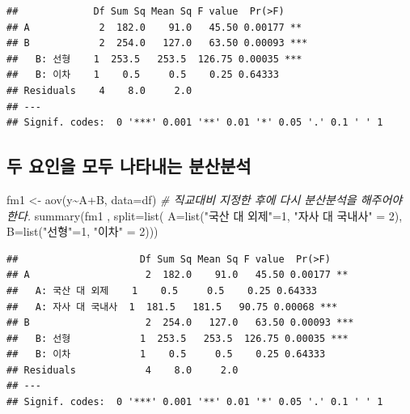 \documentclass[
]{book}
\newenvironment{Shaded}{\begin{snugshade}}{\end{snugshade}}
\newcommand{\AttributeTok}[1]{\textcolor[rgb]{0.77,0.63,0.00}{#1}}
\newcommand{\CommentTok}[1]{\textcolor[rgb]{0.56,0.35,0.01}{\textit{#1}}}
\newcommand{\DecValTok}[1]{\textcolor[rgb]{0.00,0.00,0.81}{#1}}
\newcommand{\FunctionTok}[1]{\textcolor[rgb]{0.00,0.00,0.00}{#1}}
\newcommand{\NormalTok}[1]{#1}
\newcommand{\OtherTok}[1]{\textcolor[rgb]{0.56,0.35,0.01}{#1}}
\newcommand{\SpecialCharTok}[1]{\textcolor[rgb]{0.00,0.00,0.00}{#1}}
\newcommand{\StringTok}[1]{\textcolor[rgb]{0.31,0.60,0.02}{#1}}
\begin{document}
\begin{verbatim}
##             Df Sum Sq Mean Sq F value  Pr(>F)    
## A            2  182.0    91.0   45.50 0.00177 ** 
## B            2  254.0   127.0   63.50 0.00093 ***
##   B: 선형    1  253.5   253.5  126.75 0.00035 ***
##   B: 이차    1    0.5     0.5    0.25 0.64333    
## Residuals    4    8.0     2.0                    
## ---
## Signif. codes:  0 '***' 0.001 '**' 0.01 '*' 0.05 '.' 0.1 ' ' 1
\end{verbatim}

\hypertarget{uxb450-uxc694uxc778uxc744-uxbaa8uxb450-uxb098uxd0c0uxb0b4uxb294-uxbd84uxc0b0uxbd84uxc11d}{%
\subsection{두 요인을 모두 나타내는 분산분석}\label{uxb450-uxc694uxc778uxc744-uxbaa8uxb450-uxb098uxd0c0uxb0b4uxb294-uxbd84uxc0b0uxbd84uxc11d}}

\begin{Shaded}
\begin{Highlighting}[]
\NormalTok{fm1 }\OtherTok{\textless{}{-}} \FunctionTok{aov}\NormalTok{(y}\SpecialCharTok{\textasciitilde{}}\NormalTok{A}\SpecialCharTok{+}\NormalTok{B, }\AttributeTok{data=}\NormalTok{df) }\CommentTok{\# 직교대비 지정한 후에 다시 분산분석을 해주어야 한다.}
\FunctionTok{summary}\NormalTok{(fm1 , }\AttributeTok{split=}\FunctionTok{list}\NormalTok{( }\AttributeTok{A=}\FunctionTok{list}\NormalTok{(}\StringTok{"국산 대 외제"}\OtherTok{=}\DecValTok{1}\NormalTok{, }\StringTok{"자사 대 국내사"} \OtherTok{=} \DecValTok{2}\NormalTok{), }\AttributeTok{B=}\FunctionTok{list}\NormalTok{(}\StringTok{"선형"}\OtherTok{=}\DecValTok{1}\NormalTok{, }\StringTok{"이차"} \OtherTok{=} \DecValTok{2}\NormalTok{))) }
\end{Highlighting}
\end{Shaded}

\begin{verbatim}
##                     Df Sum Sq Mean Sq F value  Pr(>F)    
## A                    2  182.0    91.0   45.50 0.00177 ** 
##   A: 국산 대 외제    1    0.5     0.5    0.25 0.64333    
##   A: 자사 대 국내사  1  181.5   181.5   90.75 0.00068 ***
## B                    2  254.0   127.0   63.50 0.00093 ***
##   B: 선형            1  253.5   253.5  126.75 0.00035 ***
##   B: 이차            1    0.5     0.5    0.25 0.64333    
## Residuals            4    8.0     2.0                    
## ---
## Signif. codes:  0 '***' 0.001 '**' 0.01 '*' 0.05 '.' 0.1 ' ' 1
\end{verbatim}
\end{document}
